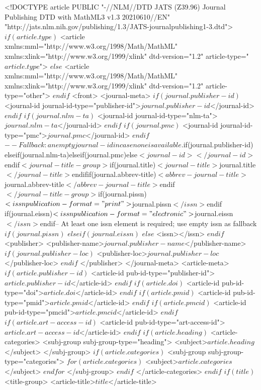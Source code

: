 <!DOCTYPE article PUBLIC "-//NLM//DTD JATS (Z39.96) Journal Publishing DTD with MathML3 v1.3 20210610//EN" "http://jats.nlm.nih.gov/publishing/1.3/JATS-journalpublishing1-3.dtd"> 
$if(article.type)$
<article xmlns:mml="http://www.w3.org/1998/Math/MathML" xmlns:xlink="http://www.w3.org/1999/xlink" dtd-version="1.2" article-type="$article.type$">
$else$
<article xmlns:mml="http://www.w3.org/1998/Math/MathML" xmlns:xlink="http://www.w3.org/1999/xlink" dtd-version="1.2" article-type="other">
$endif$
<front>
<journal-meta>
$if(journal.publisher-id)$
<journal-id journal-id-type="publisher-id">$journal.publisher-id$</journal-id>
$endif$
$if(journal.nlm-ta)$
<journal-id journal-id-type="nlm-ta">$journal.nlm-ta$</journal-id>
$endif$
$if(journal.pmc)$
<journal-id journal-id-type="pmc">$journal.pmc$</journal-id>
$endif$
$-- Fallback: an empty journal-id in case none is available.
$if(journal.publisher-id)$
$elseif(journal.nlm-ta)$
$elseif(journal.pmc)$
$else$
<journal-id></journal-id>
$endif$
<journal-title-group>
$if(journal.title)$
<journal-title>$journal.title$</journal-title>
$endif$
$if(journal.abbrev-title)$
<abbrev-journal-title>$journal.abbrev-title$</abbrev-journal-title>
$endif$
</journal-title-group>
$if(journal.pissn)$
<issn publication-format="print">$journal.pissn$</issn>
$endif$
$if(journal.eissn)$
<issn publication-format="electronic">$journal.eissn$</issn>
$endif$
$-- At least one issn element is required; use empty issn as fallback
$if(journal.pissn)$
$elseif(journal.eissn)$
$else$
<issn></issn>
$endif$
<publisher>
<publisher-name>$journal.publisher-name$</publisher-name>
$if(journal.publisher-loc)$
<publisher-loc>$journal.publisher-loc$</publisher-loc>
$endif$
</publisher>
</journal-meta>
<article-meta>
$if(article.publisher-id)$
<article-id pub-id-type="publisher-id">$article.publisher-id$</article-id>
$endif$
$if(article.doi)$
<article-id pub-id-type="doi">$article.doi$</article-id>
$endif$
$if(article.pmid)$
<article-id pub-id-type="pmid">$article.pmid$</article-id>
$endif$
$if(article.pmcid)$
<article-id pub-id-type="pmcid">$article.pmcid$</article-id>
$endif$
$if(article.art-access-id)$
<article-id pub-id-type="art-access-id">$article.art-access-id$</article-id>
$endif$
$if(article.heading)$
<article-categories>
<subj-group subj-group-type="heading">
<subject>$article.heading$</subject>
</subj-group>
$if(article.categories)$
<subj-group subj-group-type="categories">
$for(article.categories)$
<subject>$article.categories$</subject>
$endfor$
</subj-group>
$endif$
</article-categories>
$endif$
$if(title)$
<title-group>
<article-title>$title$</article-title>

